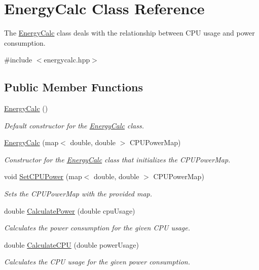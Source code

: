 \hypertarget{classEnergyCalc}{}\section{Energy\+Calc Class Reference}
\label{classEnergyCalc}


The \hyperlink{classEnergyCalc}{Energy\+Calc} class deals with the relationship between C\+PU usage and power consumption.  




{\ttfamily \#include $<$energycalc.\+hpp$>$}

\subsection*{Public Member Functions}
\begin{DoxyCompactItemize}
\item 
\hyperlink{classEnergyCalc_a6379ce8e645c7c8c2acaca31f4c350ff}{Energy\+Calc} ()
\begin{DoxyCompactList}\small\item\em Default constructor for the \hyperlink{classEnergyCalc}{Energy\+Calc} class. \end{DoxyCompactList}\item 
\hyperlink{classEnergyCalc_aaab4e727de884101dd0523ee331f8326}{Energy\+Calc} (map$<$ double, double $>$ C\+P\+U\+Power\+Map)
\begin{DoxyCompactList}\small\item\em Constructor for the \hyperlink{classEnergyCalc}{Energy\+Calc} class that initializes the C\+P\+U\+Power\+Map. \end{DoxyCompactList}\item 
void \hyperlink{classEnergyCalc_a1b883383c88c2ce543eaf4390e9c5ae3}{Set\+C\+P\+U\+Power} (map$<$ double, double $>$ C\+P\+U\+Power\+Map)
\begin{DoxyCompactList}\small\item\em Sets the C\+P\+U\+Power\+Map with the provided map. \end{DoxyCompactList}\item 
double \hyperlink{classEnergyCalc_a7b110beba82144d475b2d0fc3040762a}{Calculate\+Power} (double cpu\+Usage)
\begin{DoxyCompactList}\small\item\em Calculates the power consumption for the given C\+PU usage. \end{DoxyCompactList}\item 
double \hyperlink{classEnergyCalc_a73932d67b6f571d004d0cebca5b76621}{Calculate\+C\+PU} (double power\+Usage)
\begin{DoxyCompactList}\small\item\em Calculates the C\+PU usage for the given power consumption. \end{DoxyCompactList}\end{DoxyCompactItemize}


